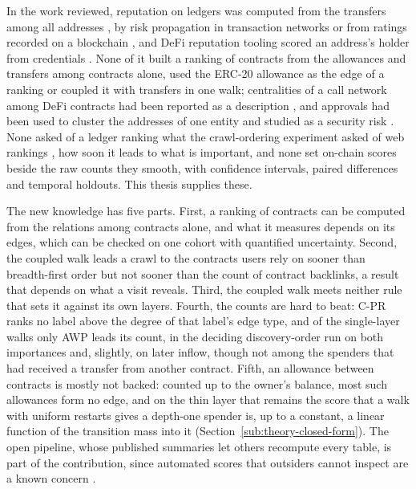 In the work reviewed, reputation on ledgers was computed from the transfers among all addresses \parencite{do2023awp}, by risk propagation in transaction networks \parencite{lin2025riskprop} or from ratings recorded on a blockchain \parencite{bellini2020trust}, and DeFi reputation tooling scored an address's holder from credentials \parencite{humanpassportnddocs}. None of it built a ranking of contracts from the allowances and transfers among contracts alone, used the ERC-20 allowance \parencite{vogelsteller2015erc20} as the edge of a ranking or coupled it with transfers in one walk; centralities of a call network among DeFi contracts had been reported as a description \parencite{kitzler2023defi}, and approvals had been used to cluster the addresses of one entity \parencite{victor2020clustering} and studied as a security risk \parencite{wang2022unlimited}. None asked of a ledger ranking what the crawl-ordering experiment asked of web rankings \parencite{cho1998crawling}, how soon it leads to what is important, and none set on-chain scores beside the raw counts they smooth, with confidence intervals, paired differences and temporal holdouts. This thesis supplies these.

The new knowledge has five parts. First, a ranking of contracts can be computed from the relations among contracts alone, and what it measures depends on its edges, which can be checked on one cohort with quantified uncertainty. Second, the coupled walk leads a crawl to the contracts users rely on sooner than breadth-first order but not sooner than the count of contract backlinks, a result that depends on what a visit reveals. Third, the coupled walk meets neither rule that sets it against its own layers. Fourth, the counts are hard to beat: \mbox{C-PR} ranks no label above the degree of that label's edge type, and of the single-layer walks only AWP leads its count, in the deciding discovery-order run on both importances and, slightly, on later inflow, though not among the spenders that had received a transfer from another contract. Fifth, an allowance between contracts is mostly not backed: counted up to the owner's balance, most such allowances form no edge, and on the thin layer that remains the score that a walk with uniform restarts gives a depth-one spender is, up to a constant, a linear function of the transition mass into it (Section~\ref{sub:theory-closed-form}). The open pipeline, whose published summaries let others recompute every table, is part of the contribution, since automated scores that outsiders cannot inspect are a known concern \parencite{packin2024credit}.

